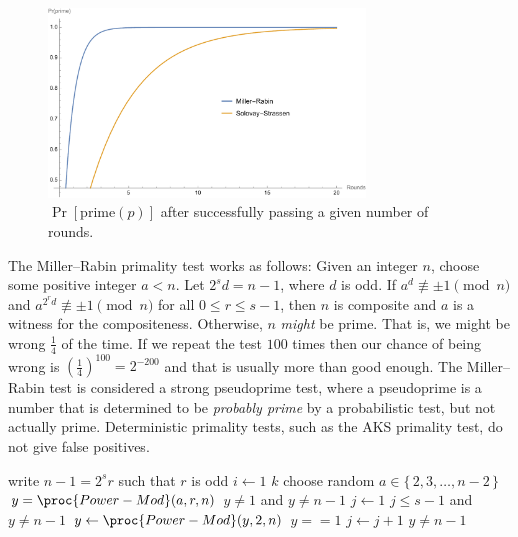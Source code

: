 \begin{figure}[tbhp]
\centering
\includegraphics[width=0.75\textwidth]{./graphs/PrimeTest.pdf}
\caption{$\Pr[\text{prime}(p)]$ after successfully passing a given number of rounds.}\label{fig:tests}
\end{figure}

The Miller–Rabin primality test works as follows: Given an integer $n$,
choose some positive integer $a < n$. Let $2^s d = n - 1$, where $d$ is
odd. If $a^d \not\equiv \pm 1 \pmod{n}$ and $a^{{2^r} d} \not\equiv \pm
1 \pmod{n}$ for all $0 \le r \le s - 1$, then $n$ is composite and $a$
is a witness for the compositeness. Otherwise, $n$ \emph{might} be
prime. That is, we might be wrong $\frac{1}{4}$ of the time. If we
repeat the test $100$ times then our chance of being wrong is
$(\frac{1}{4})^{100} = 2^{-200}$ and that is usually more than good
enough. The Miller–Rabin test is considered a strong pseudoprime test,
where a pseudoprime is a number that is determined to be \emph{probably
prime} by a probabilistic test, but not actually prime. Deterministic
primality tests, such as the AKS primality test, do not give false
positives.

\begin{codebox}
  \li write $n - 1 = 2^sr$ such that $r$ is odd
  \li \For $i \gets 1$ \To $k$
  \li \Then choose random $a \in \{\,2,3,\dots,n-2\,\}$
  \li       $y = \proc{Power-Mod}(a, r, n)$
  \li       \If $y \ne 1$ and $y \ne n - 1$
  \li       \Then $j \gets 1$
  \li             \While $j \le s - 1$ and $y \ne n - 1$
  \li             \Then $y \gets \proc{Power-Mod}(y, 2, n)$
  \li                   \If $y == 1$ \li \Then \Return {} \End
  \li                   $j \gets j + 1$
                  \End
  \li             \If $y \ne n - 1$ \li \Then \Return {} \End
            \End
      \End
  \li \Return {}
\end{codebox}


